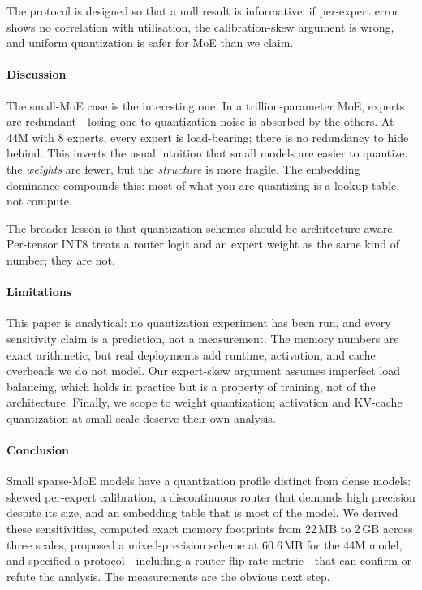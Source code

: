 The protocol is designed so that a null result is informative: if
per-expert error shows no correlation with utilisation, the
calibration-skew argument is wrong, and uniform quantization is safer
for MoE than we claim.

\paragraph{Discussion}

The small-MoE case is the interesting one. In a trillion-parameter MoE,
experts are redundant---losing one to quantization noise is absorbed by
the others. At 44M with 8 experts, every expert is load-bearing; there
is no redundancy to hide behind. This inverts the usual intuition that
small models are easier to quantize: the \emph{weights} are fewer, but
the \emph{structure} is more fragile. The embedding dominance compounds
this: most of what you are quantizing is a lookup table, not compute.

The broader lesson is that quantization schemes should be
architecture-aware. Per-tensor INT8 treats a router logit and an expert
weight as the same kind of number; they are not.

\paragraph{Limitations}

This paper is analytical: no quantization experiment has been run, and
every sensitivity claim is a prediction, not a measurement. The memory
numbers are exact arithmetic, but real deployments add runtime,
activation, and cache overheads we do not model. Our expert-skew
argument assumes imperfect load balancing, which holds in practice but
is a property of training, not of the architecture. Finally, we scope
to weight quantization; activation and KV-cache quantization at small
scale deserve their own analysis.

\paragraph{Conclusion}

Small sparse-MoE models have a quantization profile distinct from dense
models: skewed per-expert calibration, a discontinuous router that
demands high precision despite its size, and an embedding table that is
most of the model. We derived these sensitivities, computed exact
memory footprints from 22\,MB to 2\,GB across three scales, proposed a
mixed-precision scheme at 60.6\,MB for the 44M model, and specified a
protocol---including a router flip-rate metric---that can confirm or
refute the analysis. The measurements are the obvious next step.
